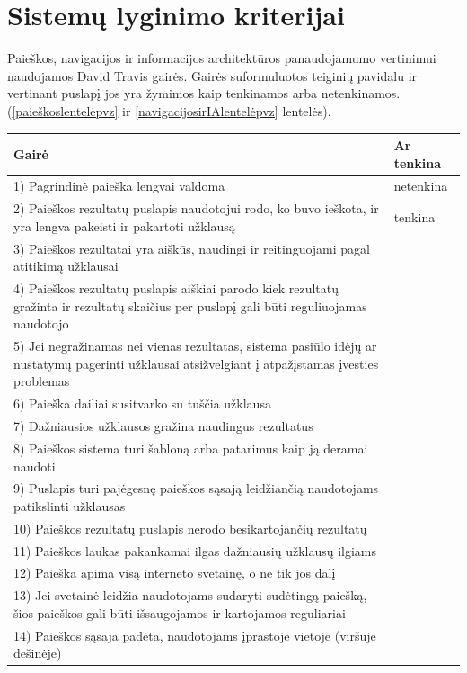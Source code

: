 \documentclass{VUMIFPSkursinis}
\begin{document}
\section{Sistemų lyginimo kriterijai}
Paieškos, navigacijos ir informacijos architektūros panaudojamumo vertinimui naudojamos David Travis gairės. Gairės suformuluotos teiginių pavidalu ir vertinant puslapį jos yra žymimos kaip tenkinamos arba netenkinamos\cite{SearchGuidelinesEn}\cite{NavigationAndIAGuidelinesEn}. (\ref{paieškoslentelėpvz} ir \ref{navigacijosirIAlentelėpvz} lentelės).
\begin{center}
\begin{tabular}{ |p{}|p{2cm}| } 
 \hline
	Gairė & Ar tenkina \\ \hline
	1) Pagrindinė paieška lengvai valdoma & netenkina \\ \hline
	2) Paieškos rezultatų puslapis naudotojui rodo, ko buvo ieškota, ir yra lengva pakeisti ir pakartoti užklausą & tenkina \\ \hline
	3) Paieškos rezultatai yra aiškūs, naudingi ir reitinguojami pagal atitikimą užklausai &  \\ \hline
	4) Paieškos rezultatų puslapis aiškiai parodo kiek rezultatų gražinta ir rezultatų skaičius per puslapį gali būti reguliuojamas naudotojo &  \\ \hline
	5) Jei negražinamas nei vienas rezultatas, sistema pasiūlo idėjų ar nustatymų pagerinti užklausai atsižvelgiant į atpažįstamas įvesties problemas &  \\ \hline
	6) Paieška dailiai susitvarko su tuščia užklausa &  \\ \hline
	7) Dažniausios užklausos gražina naudingus rezultatus &  \\ \hline
	8) Paieškos sistema turi šabloną arba patarimus kaip ją deramai naudoti &  \\ \hline
	9) Puslapis turi pajėgesnę  paieškos sąsają leidžiančią naudotojams patikslinti užklausas &  \\ \hline
	10) Paieškos rezultatų puslapis nerodo besikartojančių rezultatų &  \\ \hline
	11) Paieškos laukas pakankamai ilgas dažniausių užklausų ilgiams &  \\ \hline
	12) Paieška apima visą interneto svetainę, o ne tik jos dalį &  \\ \hline
	13) Jei svetainė leidžia naudotojams sudaryti sudėtingą paiešką, šios paieškos gali būti išsaugojamos ir kartojamos reguliariai &  \\ \hline
	14) Paieškos sąsaja padėta, naudotojams įprastoje vietoje (viršuje dešinėje) &  \\ \hline

\end{tabular}
\end{center}
\end{document}
